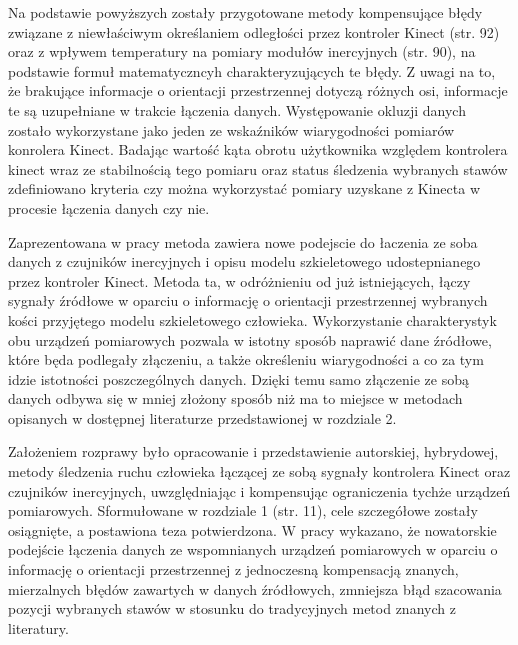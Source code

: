 \documentclass[10pt,a4paper]{article}
\begin{document}
\begin{FlushLeft}
Na podstawie powyższych zostały przygotowane metody kompensujące błędy związane z niewłaściwym określaniem odległości przez kontroler Kinect (str. 92) oraz z wpływem temperatury na pomiary modułów inercyjnych (str. 90), na podstawie formuł matematyczncyh charakteryzujących te błędy. Z uwagi na to, że brakujące informacje o orientacji przestrzennej dotyczą różnych osi, informacje te są uzupełniane w trakcie łączenia danych. Występowanie okluzji danych zostało wykorzystane jako jeden ze wskaźników wiarygodności pomiarów konrolera Kinect. Badając wartość kąta obrotu użytkownika względem kontrolera kinect wraz ze stabilnością tego pomiaru oraz status śledzenia wybranych stawów zdefiniowano kryteria czy można wykorzystać pomiary uzyskane z Kinecta w procesie łączenia danych czy nie.

Zaprezentowana w pracy metoda zawiera nowe podejscie do łaczenia ze soba danych z czujników inercyjnych i opisu modelu szkieletowego udostepnianego przez kontroler Kinect. Metoda ta, w odróżnieniu od już istniejących, łączy sygnały źródłowe w oparciu o informację o orientacji przestrzennej wybranych kości przyjętego modelu szkieletowego człowieka. Wykorzystanie charakterystyk obu urządzeń pomiarowych pozwala w istotny sposób naprawić dane źródłowe, które będa podlegały złączeniu, a także określeniu wiarygodności a co za tym idzie istotności poszczególnych danych. Dzięki temu samo złączenie ze sobą danych odbywa się w mniej złożony sposób niż ma to miejsce w metodach opisanych w dostępnej literaturze przedstawionej w rozdziale 2. 

Założeniem rozprawy było opracowanie i przedstawienie autorskiej, hybrydowej, metody śledzenia ruchu człowieka łączącej ze sobą sygnały kontrolera Kinect oraz czujników inercyjnych, uwzględniając i kompensując ograniczenia tychże urządzeń pomiarowych. Sformułowane w rozdziale 1 (str. 11), cele szczegółowe zostały osiągnięte, a postawiona teza potwierdzona. W pracy wykazano, że nowatorskie podejście łączenia danych ze wspomnianych urządzeń pomiarowych w oparciu o informację o orientacji przestrzennej z jednoczesną kompensacją znanych, mierzalnych błędów zawartych w danych źródłowych, zmniejsza błąd szacowania pozycji wybranych stawów w stosunku do tradycyjnych metod znanych z literatury.


\end{FlushLeft}
\end{document}

